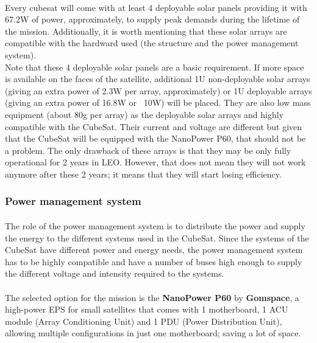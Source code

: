 \paragraph{}Every cubesat will come with at least 4 deployable solar panels providing it with 67.2W of power, approximately, to supply peak demands during the lifetime of the mission. Additionally, it is worth mentioning that these solar arrays are compatible with the hardward used (the structure and the power management system).\\
Note that these 4 deployable solar panels are a basic requirement. If more space is available on the faces of the satellite, additional 1U non-deployable solar arrays (giving an extra power of 2.3W per array, approximately) or 1U deployable arrays (giving an extra power of 16.8W or ~10W) will be placed. They are also low mass equipment (about 80g per array) as the deployable solar arrays and highly compatible with the CubeSat. Their current and voltage are different but given that the CubeSat will be equipped with the NanoPower P60, that should not be a problem. The only drawback of these arrays is that they may be only fully operational for 2 years in LEO. However, that does not mean they will not work anymore after these 2 years; it means that they will start losing efficiency.

\subsubsection{Power management system}

\paragraph{}The role of the power management system is to distribute the power and supply the energy to the different systems used in the CubeSat. Since the systems of the CubeSat have different power and energy needs, the power management system has to be highly compatible and have a number of buses high enough to supply the different voltage and intensity required to the systems.

\paragraph{}The selected option for the mission is the \textbf{NanoPower P60} by \textbf{Gomspace}, a high-power EPS for small satellites that comes with 1 motherboard, 1 ACU module (Array Conditioning Unit) and 1 PDU (Power Distribution Unit), allowing multiple configurations in just one motherboard; saving a lot of space.

